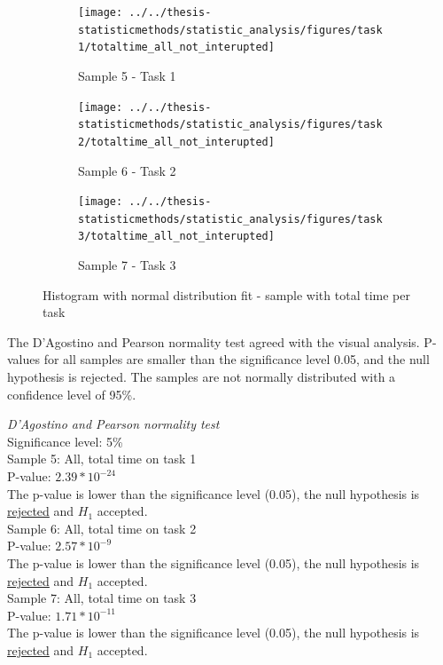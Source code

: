 \begin{figure}[h!]
	\centering
	\begin{subfigure}[b]{0.3\textwidth}
		\centering
		\texttt{[image: ../../thesis-statisticmethods/statistic\_analysis/figures/task1/totaltime\_all\_not\_interupted]}
		\caption{Sample 5 - Task 1}
		\label{fig:totaltimeallnotinterupted_task1}
	\end{subfigure}
	\begin{subfigure}[b]{0.3\textwidth}
		\centering
		\texttt{[image: ../../thesis-statisticmethods/statistic\_analysis/figures/task2/totaltime\_all\_not\_interupted]}
		\caption{Sample 6 - Task 2}
		\label{fig:totaltimeallnotinterupted_task2}
	\end{subfigure}
	\begin{subfigure}[b]{0.3\textwidth}
		\centering
		\texttt{[image: ../../thesis-statisticmethods/statistic\_analysis/figures/task3/totaltime\_all\_not\_interupted]}
		\caption{Sample 7 - Task 3}
		\label{fig:totaltimeallnotinterupted_task3}
	\end{subfigure}
	\caption{Histogram with normal distribution fit - sample with total time per task}
\end{figure}

The D'Agostino and Pearson normality test agreed with the visual analysis. P-values for all samples are smaller than the significance level 0.05, and the null hypothesis is rejected. The samples are not normally distributed with a confidence level of 95\%.\\[0.5cm]

\begin{center}
	\begin{tcolorbox}[box align=center,width=\textwidth-5cm]
		\centering
		\textit{D'Agostino and Pearson normality test}\\
		Significance level: 5\%  \\[0.5cm]
		
		Sample 5: All, total time on task 1 \\
		P-value: $2.39 * 10^{-24}$\\
		The p-value is lower than the significance level (0.05), the null hypothesis is \underline{rejected} and $H_1$ accepted.\\[0.5cm]
		
		Sample 6: All, total time on task 2 \\
		P-value: $2.57 * 10^{-9}$ \\
		The p-value is lower than the significance level (0.05), the null hypothesis is \underline{rejected} and $H_1$ accepted.\\[0.5cm]
		
		Sample 7: All, total time on task 3 \\
		P-value: $1.71 * 10^{-11}$ \\
		The p-value is lower than the significance level (0.05), the null hypothesis is \underline{rejected} and $H_1$ accepted.\\[0.5cm]
	\end{tcolorbox} 
\end{center}


